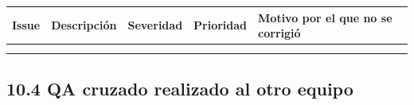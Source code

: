 {\def\LTcaptype{none} %
\begin{longtable}[]{@{}
  >{\raggedright\arraybackslash}p{}
  >{\raggedright\arraybackslash}p{}
  >{\raggedright\arraybackslash}p{}
  >{\raggedright\arraybackslash}p{}
  >{\raggedright\arraybackslash}p{}@{}}
\toprule\noalign{}
\begin{minipage}[b]{\linewidth}\raggedright
\textbf{Issue}
\end{minipage} & \begin{minipage}[b]{\linewidth}\raggedright
\textbf{Descripción}
\end{minipage} & \begin{minipage}[b]{\linewidth}\raggedright
\textbf{Severidad}
\end{minipage} & \begin{minipage}[b]{\linewidth}\raggedright
\textbf{Prioridad}
\end{minipage} & \begin{minipage}[b]{\linewidth}\raggedright
\textbf{Motivo por el que no se corrigió}
\end{minipage} \\
\midrule\noalign{}
\endhead
\bottomrule\noalign{}
\endlastfoot
& & & & \\
& & & & \\
\end{longtable}
}

\subsection{10.4 QA cruzado realizado al otro
equipo}\label{qa-cruzado-realizado-al-otro-equipo}

\pendiente{}